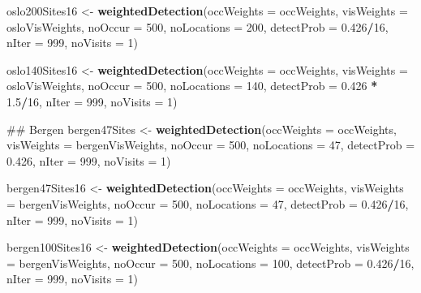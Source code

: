 \documentclass[]{article}
\newenvironment{Shaded}{\begin{snugshade}}{\end{snugshade}}
\newcommand{\KeywordTok}[1]{\textcolor[rgb]{0.13,0.29,0.53}{\textbf{#1}}}
\newcommand{\DataTypeTok}[1]{\textcolor[rgb]{0.13,0.29,0.53}{#1}}
\newcommand{\DecValTok}[1]{\textcolor[rgb]{0.00,0.00,0.81}{#1}}
\newcommand{\FloatTok}[1]{\textcolor[rgb]{0.00,0.00,0.81}{#1}}
\newcommand{\StringTok}[1]{\textcolor[rgb]{0.31,0.60,0.02}{#1}}
\newcommand{\OperatorTok}[1]{\textcolor[rgb]{0.81,0.36,0.00}{\textbf{#1}}}
\newcommand{\NormalTok}[1]{#1}
\begin{document}
\begin{Shaded}
\begin{Highlighting}[]
\NormalTok{oslo200Sites16 <-}\StringTok{ }\KeywordTok{weightedDetection}\NormalTok{(}\DataTypeTok{occWeights =}\NormalTok{ occWeights, }\DataTypeTok{visWeights =}\NormalTok{ osloVisWeights, }
    \DataTypeTok{noOccur =} \DecValTok{500}\NormalTok{, }\DataTypeTok{noLocations =} \DecValTok{200}\NormalTok{, }\DataTypeTok{detectProb =} \FloatTok{0.426}\OperatorTok{/}\DecValTok{16}\NormalTok{, }\DataTypeTok{nIter =} \DecValTok{999}\NormalTok{, }\DataTypeTok{noVisits =} \DecValTok{1}\NormalTok{)}

\NormalTok{oslo140Sites16 <-}\StringTok{ }\KeywordTok{weightedDetection}\NormalTok{(}\DataTypeTok{occWeights =}\NormalTok{ occWeights, }\DataTypeTok{visWeights =}\NormalTok{ osloVisWeights, }
    \DataTypeTok{noOccur =} \DecValTok{500}\NormalTok{, }\DataTypeTok{noLocations =} \DecValTok{140}\NormalTok{, }\DataTypeTok{detectProb =} \FloatTok{0.426} \OperatorTok{*}\StringTok{ }\FloatTok{1.5}\OperatorTok{/}\DecValTok{16}\NormalTok{, }\DataTypeTok{nIter =} \DecValTok{999}\NormalTok{, }
    \DataTypeTok{noVisits =} \DecValTok{1}\NormalTok{)}

\NormalTok{## Bergen}
\NormalTok{bergen47Sites <-}\StringTok{ }\KeywordTok{weightedDetection}\NormalTok{(}\DataTypeTok{occWeights =}\NormalTok{ occWeights, }\DataTypeTok{visWeights =}\NormalTok{ bergenVisWeights, }
    \DataTypeTok{noOccur =} \DecValTok{500}\NormalTok{, }\DataTypeTok{noLocations =} \DecValTok{47}\NormalTok{, }\DataTypeTok{detectProb =} \FloatTok{0.426}\NormalTok{, }\DataTypeTok{nIter =} \DecValTok{999}\NormalTok{, }\DataTypeTok{noVisits =} \DecValTok{1}\NormalTok{)}

\NormalTok{bergen47Sites16 <-}\StringTok{ }\KeywordTok{weightedDetection}\NormalTok{(}\DataTypeTok{occWeights =}\NormalTok{ occWeights, }\DataTypeTok{visWeights =}\NormalTok{ bergenVisWeights, }
    \DataTypeTok{noOccur =} \DecValTok{500}\NormalTok{, }\DataTypeTok{noLocations =} \DecValTok{47}\NormalTok{, }\DataTypeTok{detectProb =} \FloatTok{0.426}\OperatorTok{/}\DecValTok{16}\NormalTok{, }\DataTypeTok{nIter =} \DecValTok{999}\NormalTok{, }\DataTypeTok{noVisits =} \DecValTok{1}\NormalTok{)}

\NormalTok{bergen100Sites16 <-}\StringTok{ }\KeywordTok{weightedDetection}\NormalTok{(}\DataTypeTok{occWeights =}\NormalTok{ occWeights, }\DataTypeTok{visWeights =}\NormalTok{ bergenVisWeights, }
    \DataTypeTok{noOccur =} \DecValTok{500}\NormalTok{, }\DataTypeTok{noLocations =} \DecValTok{100}\NormalTok{, }\DataTypeTok{detectProb =} \FloatTok{0.426}\OperatorTok{/}\DecValTok{16}\NormalTok{, }\DataTypeTok{nIter =} \DecValTok{999}\NormalTok{, }\DataTypeTok{noVisits =} \DecValTok{1}\NormalTok{)}



\end{Highlighting}
\end{Shaded}
\end{document}
